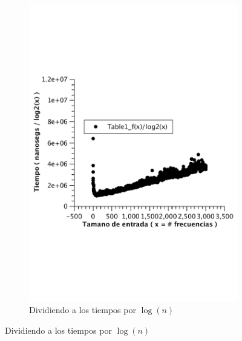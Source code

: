 \begin{figure}[H]
        \centering
        \begin{subfigure}[b]{0.5\textwidth}
                \includegraphics[width=\textwidth]{imagenes/af-rand-lineal.pdf}
                \caption*{Dividiendo a los tiempos por $\log(n)$}
        \end{subfigure}
\end{figure}

